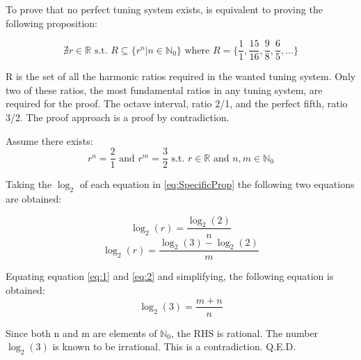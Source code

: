 
To prove\footnotemark{} that no perfect tuning system exists, is equivalent to
proving the following proposition:

\begin{equation}\label{eq:GeneralProp}
	\nexists r \in \mathbb{R} \text{ s.t. }
	R \subseteq \{ r^n | n \in \mathbb{N}_0 \}
	\text{ where } R = \{ \frac{1}{1}, \frac{15}{16}, \frac{9}{8}, \frac{6}{5}, \dots \}
\end{equation}

R is the set of all the harmonic ratios required in the wanted tuning system. Only
two of these ratios, the most fundamental ratios in any tuning system, are
required for the proof. The octave interval, ratio 2/1, and the perfect fifth,
ratio 3/2. The proof approach is a proof by contradiction.

Assume there exists:
\begin{equation}\label{eq:SpecificProp}
	r^n = \frac{2}{1} \text{ and } r^m = \frac{3}{2}
	\text{ s.t. }
	r \in \mathbb{R} \text{ and } n,m \in \mathbb{N}_0
\end{equation}

Taking the $\log_{2}$ of each equation in \ref{eq:SpecificProp} the following two
equations are obtained:

\begin{equation}\label{eq:1}
	\log_{2}(r) = \frac{\log_{2}(2)}{n}
\end{equation}
\begin{equation}\label{eq:2}
	\log_{2}(r) = \frac{\log_{2}(3) - \log_{2}(2)}{m}
\end{equation}

Equating equation \ref{eq:1} and \ref{eq:2} and simplifying, the following
equation is obtained:
\begin{equation}\label{eq:3}
	\log_{2}(3) = \frac{m+n}{n}
\end{equation}

Since both n and m are elements of $\mathbb{N}_0$, the RHS is rational. The
number $\log_{2}(3)$ is known to be irrational. This is a contradiction. Q.E.D.

